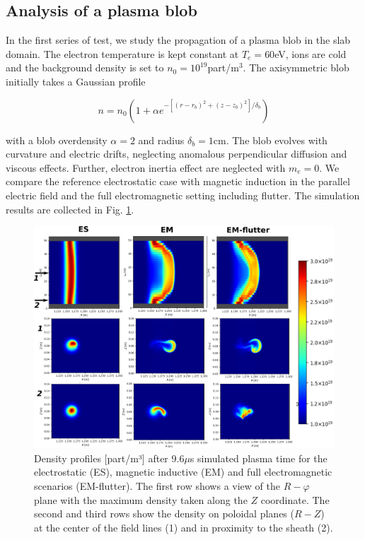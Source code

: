 \subsection{Analysis of a plasma blob}
\label{ssec:plasmablob}

In the first series of test, we study the propagation of a plasma blob in the slab domain. The electron temperature is kept constant at $T_e=60$eV, ions are cold and the background density is set to $n_0 = 10^{19}$part/m$^3$. The axisymmetric blob initially takes a Gaussian profile 

\begin{equation}
	n = n_0 \left(1 + \alpha e^{-\left[(r-r_b)^2+(z-z_b)^2\right]/\delta_b}\right)
	\label{eq:blobInitProfile}
\end{equation}

with a blob overdensity $\alpha = 2$ and radius $\delta_b = 1$cm. The blob evolves with curvature and electric drifts, neglecting anomalous perpendicular diffusion and viscous effects. Further, electron inertia effect are neglected with $m_e = 0$. We compare the reference electrostatic case with magnetic induction in the parallel electric field and the full electromagnetic setting including flutter. The simulation results are collected in Fig. \ref{fig:BLOB}. \newline

\begin{figure}[H]\centering
	\centering
	\includegraphics[width=1.\textwidth]{schemes/blob_compare_9_6_microsec.png}
	\caption{Density profiles [part/m³] after 9.6$\mu$s simulated plasma time for the electrostatic (ES), magnetic inductive (EM) and full electromagnetic scenarios (EM-flutter). The first row shows a view of the $R-\varphi$ plane with the maximum density taken along the $Z$ coordinate. The second and third rows show the density on poloidal planes ($R-Z$) at the center of the field lines (1) and in proximity to the sheath (2).}
	\label{fig:BLOB}
\end{figure}

